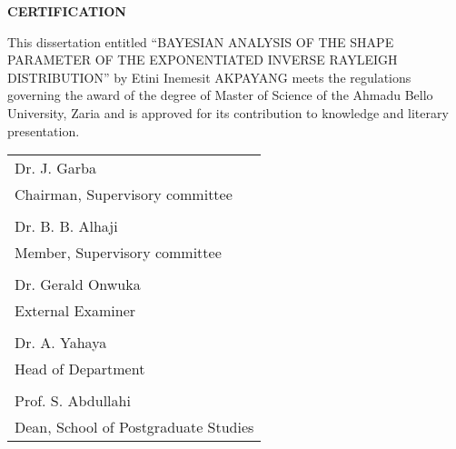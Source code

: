 \documentclass[a4paper,12pt]{report}
\begin{document}
\newpage
\begin{center}
\bf	CERTIFICATION\\
\end{center}
{\singlespacing
\noindent This dissertation entitled ``BAYESIAN ANALYSIS OF THE SHAPE PARAMETER OF THE EXPONENTIATED INVERSE RAYLEIGH DISTRIBUTION'' by Etini Inemesit AKPAYANG meets the regulations governing the award of the degree of Master of Science of the Ahmadu Bello University, Zaria and is approved for its contribution to knowledge and literary presentation. \vspace{0.5cm}\\

\vspace*{4em}
\noindent
\begin{tabular}[t]{l}
	Dr. J. Garba\\ Chairman, Supervisory committee
	\hspace{1cm}\\
	\vspace*{4em}	\\
		Dr. B. B. Alhaji \\ Member, Supervisory committee
	\hspace{1cm}\\
	\vspace*{4em}	\\
	Dr. Gerald Onwuka\\ External Examiner
	\hspace{1cm}\\
	\vspace*{4em}	\\
	Dr. A. Yahaya \\ Head of Department
	\hspace{1cm}\\
	\vspace*{4em}	\\
		Prof. S. Abdullahi \\ Dean, School of Postgraduate Studies 
	\hspace{1cm}
	

\end{tabular}}
\end{document}
